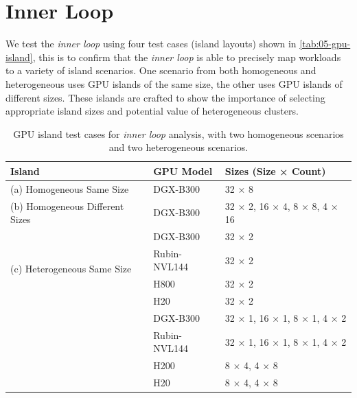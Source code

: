 \section{Inner Loop}
\label{chap:}

We test the \textit{inner loop} using four test cases (island layouts) shown in \autoref{tab:05-gpu-island}, this is to confirm that the \textit{inner loop} is able to precisely map workloads to a variety of island scenarios.
One scenario from both homogeneous and heterogeneous uses GPU islands of the same size, the other uses GPU islands of different sizes.
These islands are crafted to show the importance of selecting appropriate island sizes and potential value of heterogeneous clusters.

\begin{table}[ht]
  \centering
  \small
  \begin{tabular}{@{} l l l @{}}
    \toprule
    Island                            & GPU Model      & Sizes (Size × Count)              \\
    \midrule
    (a) Homogeneous Same Size         & DGX-B300       & 32 × 8                            \\
    (b) Homogeneous Different Sizes   & DGX-B300       & 32 × 2, 16 × 4, 8 × 8, 4 × 16     \\
    \midrule
    \multirow{4}{*}{(c) Heterogeneous Same Size}
                                      & DGX-B300       & 32 × 2                            \\
                                      & Rubin-NVL144   & 32 × 2                            \\
                                      & H800           & 32 × 2                            \\
                                      & H20            & 32 × 2                            \\
    \addlinespace
    \multirow{4}{*}{(d) Heterogeneous Different Sizes}
                                      & DGX-B300       & 32 × 1, 16 × 1, 8 × 1, 4 × 2      \\
                                      & Rubin-NVL144   & 32 × 1, 16 × 1, 8 × 1, 4 × 2      \\
                                      & H200           & 8 × 4, 4 × 8                      \\
                                      & H20            & 8 × 4, 4 × 8                      \\
    \bottomrule
  \end{tabular}
  \caption{GPU island test cases for \textit{inner loop} analysis, with two homogeneous scenarios and two heterogeneous scenarios.}
  \label{tab:05-gpu-island}
\end{table}

